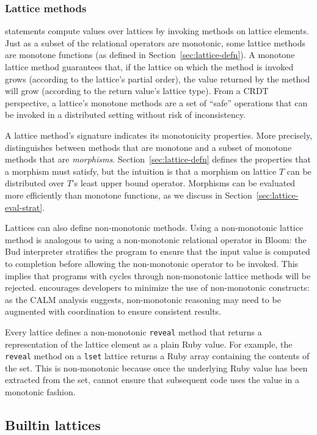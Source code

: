 \subsubsection{Lattice methods}
\lang statements compute values over lattices by invoking methods on lattice
elements. Just as a subset of the relational operators are monotonic, some
lattice methods are monotone functions (as defined in
Section~\ref{sec:lattice-defn}). A monotone lattice method guarantees that, if
the lattice on which the method is invoked grows (according to the lattice's
partial order), the value returned by the method will grow (according to the
return value's lattice type). From a CRDT perspective, a lattice's monotone
methods are a set of ``safe'' operations that can be invoked in a distributed
setting without risk of inconsistency.

A lattice method's signature indicates its monotonicity properties. More
precisely, \lang distinguishes between methods that are monotone and a subset of
monotone methods that are \emph{morphisms}. Section~\ref{sec:lattice-defn}
defines the properties that a morphism must satisfy, but the intuition is that a
morphism on lattice $T$ can be distributed over $T$'s least upper bound
operator. Morphisms can be evaluated more efficiently than monotone functions,
as we discuss in Section~\ref{sec:lattice-eval-strat}.

Lattices can also define non-monotonic methods. Using a non-monotonic lattice
method is analogous to using a non-monotonic relational operator in Bloom: the
Bud interpreter stratifies the program to ensure that the input value is
computed to completion before allowing the non-monotonic operator to be invoked. This
implies that programs with cycles through non-monotonic lattice methods will be
rejected. \lang encourages developers to minimize the use of non-monotonic
constructs: as the CALM analysis suggests, non-monotonic reasoning may need to
be augmented with coordination to ensure consistent results.

Every lattice defines a non-monotonic \texttt{reveal} method that returns a
representation of the lattice element as a plain Ruby value. For example, the
\texttt{reveal} method on a \texttt{lset} lattice returns a Ruby array
containing the contents of the set. This is non-monotonic because once the
underlying Ruby value has been extracted from the set, \lang cannot ensure that
subsequent code uses the value in a monotonic fashion.

\subsection{Builtin lattices}
\label{sec:lattice-builtins}

